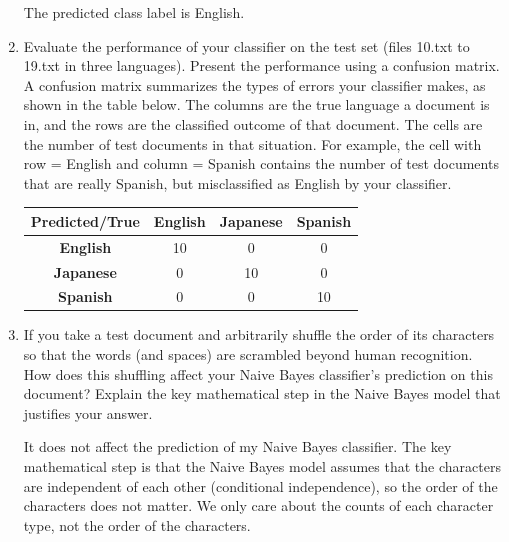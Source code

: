 \documentclass[a4paper]{article}
\theoremstyle{definition}
\newenvironment{soln}{
    \leavevmode\color{blue}\ignorespaces
}{}
\begin{document}
\begin{enumerate}
\begin{soln}
    The predicted class label is English.
\end{soln}


\item
Evaluate the performance of your classifier on the test set (files 10.txt to 19.txt in three languages).
Present the performance using a confusion matrix. A confusion matrix summarizes the types of errors your classifier makes, as shown in the table below.   The columns are the true language a document is in, and the rows are the classified outcome of that document.  The cells are the number of test documents in that situation.  For example, the cell with row = English and column = Spanish contains the number of test documents that are really Spanish, but misclassified as English by your classifier.
\begin{soln}
    \begin{table}[h]
        \centering
        \begin{tabular}{|c|c|c|c|}
            \hline
            \textbf{Predicted/True} & \textbf{English} & \textbf{Japanese} & \textbf{Spanish} \\
            \hline
            \textbf{English} & 10 & 0 & 0 \\
            \hline
            \textbf{Japanese} & 0 & 10 & 0 \\
            \hline
            \textbf{Spanish} & 0 & 0 & 10 \\
            \hline
        \end{tabular}
    \end{table}    
\end{soln}


\item If you take a test document and arbitrarily shuffle the order of its characters so that the words (and spaces) are scrambled beyond human recognition.  How does this shuffling affect your Naive Bayes classifier's prediction on this document?  Explain the key mathematical step in the Naive Bayes model that justifies your answer.

\begin{soln}
    It does not affect the prediction of my Naive Bayes classifier.  The key mathematical step is that the Naive Bayes model assumes that the characters are independent of each other (conditional independence), so the order of the characters does not matter.
    We only care about the counts of each character type, not the order of the characters.
\end{soln}


\end{enumerate}
\end{document}
